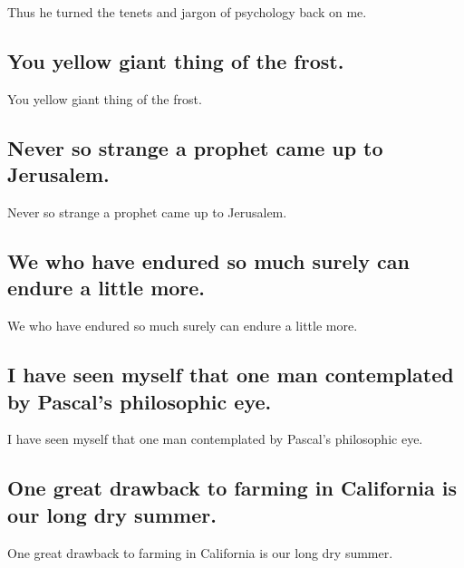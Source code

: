 \documentclass[]{article}
\begin{document}
Thus he turned the tenets and jargon of psychology back on me.

\hypertarget{you-yellow-giant-thing-of-the-frost.}{%
\subsection{You yellow giant thing of the
frost.}\label{you-yellow-giant-thing-of-the-frost.}}

You yellow giant thing of the frost.

\hypertarget{never-so-strange-a-prophet-came-up-to-jerusalem.}{%
\subsection{Never so strange a prophet came up to
Jerusalem.}\label{never-so-strange-a-prophet-came-up-to-jerusalem.}}

Never so strange a prophet came up to Jerusalem.

\hypertarget{we-who-have-endured-so-much-surely-can-endure-a-little-more.}{%
\subsection{We who have endured so much surely can endure a little
more.}\label{we-who-have-endured-so-much-surely-can-endure-a-little-more.}}

We who have endured so much surely can endure a little more.

\hypertarget{i-have-seen-myself-that-one-man-contemplated-by-pascals-philosophic-eye.}{%
\subsection{I have seen myself that one man contemplated by Pascal's
philosophic
eye.}\label{i-have-seen-myself-that-one-man-contemplated-by-pascals-philosophic-eye.}}

I have seen myself that one man contemplated by Pascal's philosophic
eye.

\hypertarget{one-great-drawback-to-farming-in-california-is-our-long-dry-summer.}{%
\subsection{One great drawback to farming in California is our long dry
summer.}\label{one-great-drawback-to-farming-in-california-is-our-long-dry-summer.}}

One great drawback to farming in California is our long dry summer.
\end{document}
